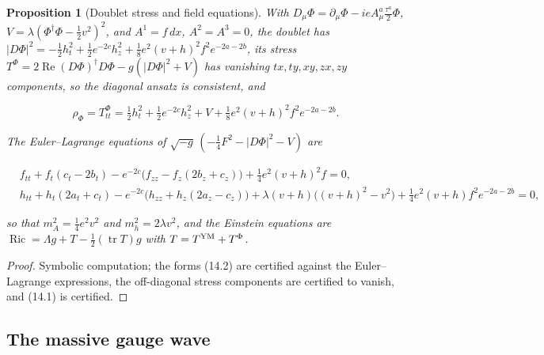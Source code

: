 \documentclass[11pt]{article}
\newtheorem{proposition}[theorem]{Proposition}
\theoremstyle{remark}
\begin{document}
\begin{proposition}[Doublet stress and field equations]
\label{prop:v20v11-system}
With \(D_\mu\Phi=\partial_\mu\Phi-ieA^a_\mu\tfrac{\tau^a}2\Phi\),
\(V=\lambda(\Phi^\dagger\Phi-\tfrac12v^2)^2\), and \(A^1=f\,dx\),
\(A^2=A^3=0\), the doublet has
\(|D\Phi|^2=-\tfrac12h_t^2+\tfrac12e^{-2c}h_z^2+\tfrac18e^2(v+h)^2f^2e^{-2a-2b}\),
its stress \(T^\Phi=2\operatorname{Re}(D\Phi)^\dagger D\Phi-g(|D\Phi|^2+V)\)
has vanishing \(tx,ty,xy,zx,zy\) components, so the diagonal ansatz
is consistent, and

\[
 \rho_\Phi=T^\Phi_{tt}=\tfrac12h_t^2+\tfrac12e^{-2c}h_z^2+V+\tfrac18e^2(v+h)^2f^2e^{-2a-2b}.
                                                                    \tag{14.1}
\]

The Euler--Lagrange equations of
\(\sqrt{-g}\,(-\tfrac14F^2-|D\Phi|^2-V)\) are

\[
\begin{aligned}
 &f_{tt}+f_t(c_t-2b_t)-e^{-2c}\bigl(f_{zz}-f_z(2b_z+c_z)\bigr)+\tfrac14e^2(v+h)^2f=0,\\
 &h_{tt}+h_t(2a_t+c_t)-e^{-2c}\bigl(h_{zz}+h_z(2a_z-c_z)\bigr)
  +\lambda(v+h)\bigl((v+h)^2-v^2\bigr)+\tfrac14e^2(v+h)f^2e^{-2a-2b}=0,
\end{aligned}                                                          \tag{14.2}
\]

so that \(m_A^2=\tfrac14e^2v^2\) and \(m_h^2=2\lambda v^2\), and the
Einstein equations are \(\operatorname{Ric}=\Lambda g+T-\tfrac12(\operatorname{tr}T)g\)
with \(T=T^{\rm YM}+T^\Phi\).
\end{proposition}

\begin{proof}
Symbolic computation; the forms (14.2) are certified against the
Euler--Lagrange expressions, the off-diagonal stress components are
certified to vanish, and (14.1) is certified.
\end{proof}

\subsection{The massive gauge wave}
\end{document}
